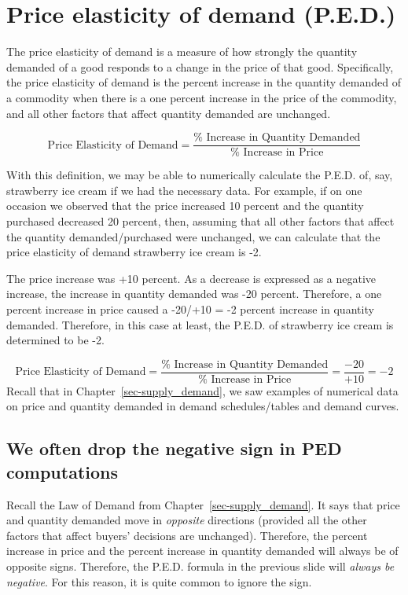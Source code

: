 \documentclass[
  letterpaper,
]{book}
\begin{document}
\section{Price elasticity of demand
(P.E.D.)}\label{price-elasticity-of-demand-p.e.d.}

The price elasticity of demand is a measure of how strongly the quantity
demanded of a good responds to a change in the price of that good.
Specifically, the price elasticity of demand is the percent increase in
the quantity demanded of a commodity when there is a one percent
increase in the price of the commodity, and all other factors that
affect quantity demanded are unchanged.

\[
\text{Price Elasticity of Demand}=\frac{\text{%
\]

With this definition, we may be able to numerically calculate the P.E.D.
of, say, strawberry ice cream if we had the necessary data. For example,
if on one occasion we observed that the price increased 10 percent and
the quantity purchased decreased 20 percent, then, assuming that all
other factors that affect the quantity demanded/purchased were
unchanged, we can calculate that the price elasticity of demand
strawberry ice cream is -2.

The price increase was +10 percent. As a decrease is expressed as a
negative increase, the increase in quantity demanded was -20 percent.
Therefore, a one percent increase in price caused a -20/+10 = -2 percent
increase in quantity demanded. Therefore, in this case at least, the
P.E.D. of strawberry ice cream is determined to be -2.

\[
\text{Price Elasticity of Demand}=\frac{\text{%
\] Recall that in Chapter~\ref{sec-supply_demand}, we saw examples of
numerical data on price and quantity demanded in demand schedules/tables
and demand curves.

\subsection{We often drop the negative sign in PED
computations}\label{we-often-drop-the-negative-sign-in-ped-computations}

Recall the Law of Demand from Chapter~\ref{sec-supply_demand}. It says
that price and quantity demanded move in \emph{opposite} directions
(provided all the other factors that affect buyers' decisions are
unchanged). Therefore, the percent increase in price and the percent
increase in quantity demanded will always be of opposite signs.
Therefore, the P.E.D. formula in the previous slide will \emph{always be
negative}. For this reason, it is quite common to ignore the sign.
\end{document}
